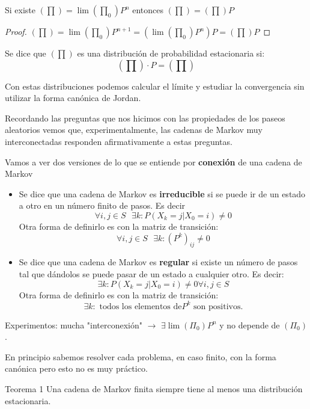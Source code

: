 \obs Si existe $(\prod) = \lim (\prod_0) P^n$ entonces $(\prod) = (\prod) P$
\begin{proof}
	$(\prod) = \lim(\prod_0) P^{n+1} = (\lim (\prod_0)P^n)P = (\prod) P$
\end{proof}

\begin{defn}
	Se dice que $(\prod)$ es una distribución de probabilidad estacionaria si:
	$$(\prod)\cdot P = (\prod)$$
\end{defn}

\obs Con estas distribuciones podemos calcular el límite y estudiar la convergencia sin utilizar la forma canónica de Jordan.


Recordando las preguntas que nos hicimos con las propiedades de los paseos aleatorios vemos que, experimentalmente, las cadenas de Markov muy interconectadas responden afirmativamente a estas preguntas.

Vamos a ver dos versiones de lo que se entiende por \textbf{conexión} de una cadena de Markov
\newpage
\begin{itemize}
	\item \begin{defn}[Irreducible]
		Se dice que una cadena de Markov es \textbf{irreducible} si se puede ir de un estado a otro en un número finito de pasos. Es decir
		$$\forall i,j \in S\text{    }\exists k : P(X_k = j| X_0 = i) \neq 0$$
		Otra forma de definirlo es con la matriz de transición:
		$$\forall i,j \in S \text{    }\exists k: (P^k)_{ij} \neq 0$$
	\end{defn}
	\item \begin{defn}[Regular]
		Se dice que una cadena de Markov es \textbf{regular} si existe un número de pasos tal que dándolos se puede pasar de un estado a cualquier otro. Es decir:
		$$ \exists k : P(X_k = j| X_0 = i) \neq 0  \forall i,j \in S $$
		Otra forma de definirlo es con la matriz de transición:
		$$\exists k : \text{ todos los elementos de} P^k \text{ son positivos.}$$
	\end{defn}
\end{itemize}


Experimentos: mucha "interconexión" $\rightarrow$ $\exists \lim (\Pi_0)P^n$ y no depende de $(\Pi_0)$.

En principio sabemos resolver cada problema, en caso finito, con la forma canónica pero esto no es muy práctico.

\begin{theorem}{Teorema 1}
	\label{Markov_tma1}
	Una cadena de Markov finita siempre tiene al menos una distribución estacionaria.
\end{theorem}

